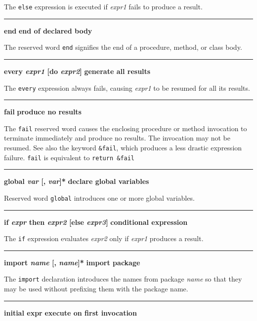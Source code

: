 \noindent
{}The \texttt{else} expression is executed if \textit{expr1}
fails to produce a result.

\bigskip\hrule\vspace{0.1cm}
\noindent
{\bf end } \hfill {\bf end of declared body}

\noindent
{}The reserved word \texttt{end} signifies the end of a
procedure, method, or class body.

\bigskip\hrule\vspace{0.1cm}
\noindent
{\bf \textbf{every} \textit{expr1} [do \textit{expr2}] } \hfill {\bf generate all results}

\noindent
{}The \texttt{every} expression always fails, causing
\textit{expr1} to be resumed for all its results.

\bigskip\hrule\vspace{0.1cm}
\noindent
{\bf fail } \hfill {\bf produce no results}

\noindent
{}The \texttt{fail} reserved word causes the enclosing
procedure or method invocation to terminate immediately and produce no
results. The invocation may not be resumed. See also the keyword
\texttt{\&fail}, which produces a less drastic expression failure.
\texttt{fail} is equivalent to \texttt{return \&fail}

\bigskip\hrule\vspace{0.1cm}
\noindent
{\bf \textbf{global} \textit{var} [, \textit{var}]* } \hfill {\bf declare global variables}

\noindent
{}Reserved word \texttt{global} introduces one or more
global variables.

\bigskip\hrule\vspace{0.1cm}
\noindent
{\bf \textbf{if} \textit{expr} then \textit{expr2} [else \textit{expr3}] } \hfill {\bf conditional expression}

\noindent
{}The \texttt{if} expression evaluates \textit{expr2} only if
\textit{expr1} produces a result.

\bigskip\hrule\vspace{0.1cm}
\noindent
{\bf \textbf{import} \textit{name} [, \textit{name}]* } \hfill {\bf import package}

\noindent
{}The \texttt{import} declaration introduces the names from
package \textit{name} so that they may be used without prefixing them
with the package name.

\bigskip\hrule\vspace{0.1cm}
\noindent
{\bf initial expr } \hfill {\bf execute on first invocation}

